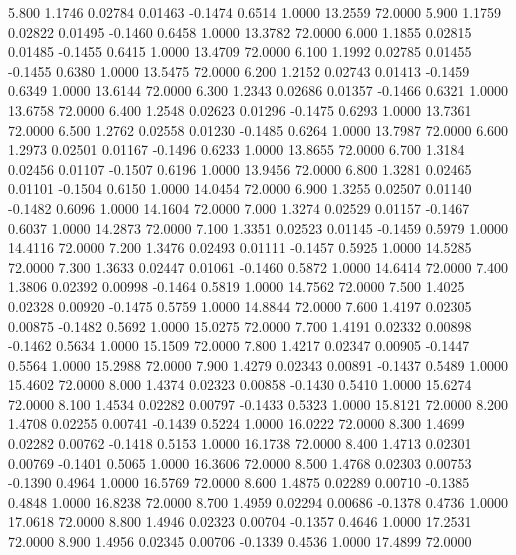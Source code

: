    5.800   1.1746   0.02784   0.01463  -0.1474   0.6514   1.0000  13.2559  72.0000
   5.900   1.1759   0.02822   0.01495  -0.1460   0.6458   1.0000  13.3782  72.0000
   6.000   1.1855   0.02815   0.01485  -0.1455   0.6415   1.0000  13.4709  72.0000
   6.100   1.1992   0.02785   0.01455  -0.1455   0.6380   1.0000  13.5475  72.0000
   6.200   1.2152   0.02743   0.01413  -0.1459   0.6349   1.0000  13.6144  72.0000
   6.300   1.2343   0.02686   0.01357  -0.1466   0.6321   1.0000  13.6758  72.0000
   6.400   1.2548   0.02623   0.01296  -0.1475   0.6293   1.0000  13.7361  72.0000
   6.500   1.2762   0.02558   0.01230  -0.1485   0.6264   1.0000  13.7987  72.0000
   6.600   1.2973   0.02501   0.01167  -0.1496   0.6233   1.0000  13.8655  72.0000
   6.700   1.3184   0.02456   0.01107  -0.1507   0.6196   1.0000  13.9456  72.0000
   6.800   1.3281   0.02465   0.01101  -0.1504   0.6150   1.0000  14.0454  72.0000
   6.900   1.3255   0.02507   0.01140  -0.1482   0.6096   1.0000  14.1604  72.0000
   7.000   1.3274   0.02529   0.01157  -0.1467   0.6037   1.0000  14.2873  72.0000
   7.100   1.3351   0.02523   0.01145  -0.1459   0.5979   1.0000  14.4116  72.0000
   7.200   1.3476   0.02493   0.01111  -0.1457   0.5925   1.0000  14.5285  72.0000
   7.300   1.3633   0.02447   0.01061  -0.1460   0.5872   1.0000  14.6414  72.0000
   7.400   1.3806   0.02392   0.00998  -0.1464   0.5819   1.0000  14.7562  72.0000
   7.500   1.4025   0.02328   0.00920  -0.1475   0.5759   1.0000  14.8844  72.0000
   7.600   1.4197   0.02305   0.00875  -0.1482   0.5692   1.0000  15.0275  72.0000
   7.700   1.4191   0.02332   0.00898  -0.1462   0.5634   1.0000  15.1509  72.0000
   7.800   1.4217   0.02347   0.00905  -0.1447   0.5564   1.0000  15.2988  72.0000
   7.900   1.4279   0.02343   0.00891  -0.1437   0.5489   1.0000  15.4602  72.0000
   8.000   1.4374   0.02323   0.00858  -0.1430   0.5410   1.0000  15.6274  72.0000
   8.100   1.4534   0.02282   0.00797  -0.1433   0.5323   1.0000  15.8121  72.0000
   8.200   1.4708   0.02255   0.00741  -0.1439   0.5224   1.0000  16.0222  72.0000
   8.300   1.4699   0.02282   0.00762  -0.1418   0.5153   1.0000  16.1738  72.0000
   8.400   1.4713   0.02301   0.00769  -0.1401   0.5065   1.0000  16.3606  72.0000
   8.500   1.4768   0.02303   0.00753  -0.1390   0.4964   1.0000  16.5769  72.0000
   8.600   1.4875   0.02289   0.00710  -0.1385   0.4848   1.0000  16.8238  72.0000
   8.700   1.4959   0.02294   0.00686  -0.1378   0.4736   1.0000  17.0618  72.0000
   8.800   1.4946   0.02323   0.00704  -0.1357   0.4646   1.0000  17.2531  72.0000
   8.900   1.4956   0.02345   0.00706  -0.1339   0.4536   1.0000  17.4899  72.0000
